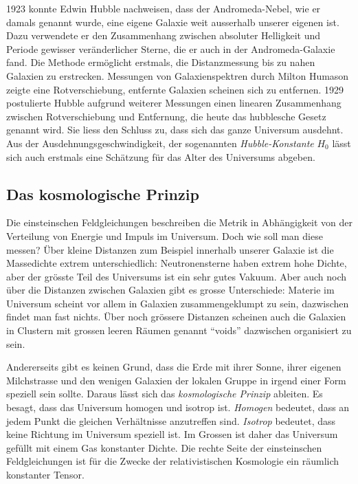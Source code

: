 1923 konnte Edwin Hubble nachweisen, dass der Andromeda-Nebel, wie
%
er damals genannt wurde, eine eigene Galaxie weit ausserhalb unserer
eigenen ist.
Dazu verwendete er den Zusammenhang zwischen absoluter Helligkeit
und Periode gewisser veränderlicher Sterne, die er auch in der
Andromeda-Galaxie fand.
%
Die Methode ermöglicht erstmals, die Distanzmessung bis zu nahen Galaxien
zu erstrecken.
Messungen von Galaxienspektren durch Milton Humason 
%
zeigte eine Rotverschiebung, entfernte Galaxien scheinen sich zu
%
entfernen.
1929 postulierte Hubble aufgrund weiterer Messungen einen linearen
Zusammenhang zwischen Rotverschiebung und Entfernung, die heute
das hubblesche Gesetz genannt wird.
%
%
Sie liess den Schluss zu, dass sich das ganze Universum ausdehnt.
Aus der Ausdehnungsgeschwindigkeit, der sogenannten 
\emph{Hubble-Konstante} $H_0$
%
lässt sich auch erstmals eine Schätzung für das Alter des Universums
abgeben.

%
%
\subsection{Das kosmologische Prinzip}
Die einsteinschen Feldgleichungen beschreiben die Metrik in Abhängigkeit
von der Verteilung von Energie und Impuls im Universum.
Doch wie soll man diese messen?
Über kleine Distanzen zum Beispiel innerhalb unserer Galaxie ist die
Massedichte extrem unterschiedlich:
Neutronensterne haben extrem hohe Dichte, aber der grösste Teil des
Universums ist ein sehr gutes Vakuum.
Aber auch noch über die Distanzen zwischen Galaxien gibt es grosse
Unterschiede: Materie im Universum scheint vor allem in Galaxien
zusammengeklumpt zu sein, dazwischen findet man fast nichts.
Über noch grössere Distanzen scheinen auch die Galaxien in Clustern
mit grossen leeren Räumen genannt ``voids'' dazwischen organisiert
zu sein.

Andererseits gibt es keinen Grund, dass die Erde mit ihrer Sonne, ihrer
eigenen Milchstrasse und den wenigen Galaxien der lokalen Gruppe in
irgend einer Form speziell sein sollte.
Daraus lässt sich das \emph{kosmologische Prinzip} ableiten.
%
Es besagt, dass das Universum homogen und isotrop ist.
\emph{Homogen} bedeutet, dass an jedem Punkt die gleichen Verhältnisse
anzutreffen sind.
%
\emph{Isotrop} bedeutet, dass keine Richtung im Universum speziell ist.
Im Grossen ist daher das Universum gefüllt mit einem Gas konstanter
Dichte.
%
Die rechte Seite der einsteinschen Feldgleichungen ist für die 
Zwecke der relativistischen Kosmologie ein räumlich konstanter Tensor.

